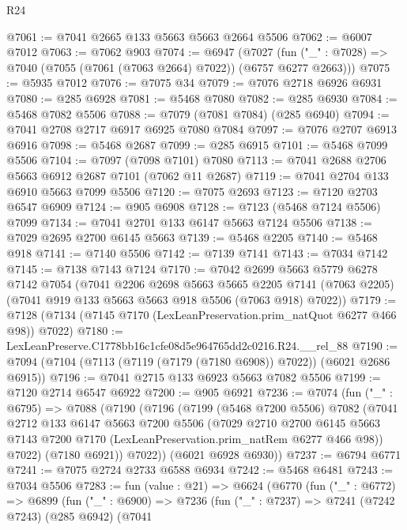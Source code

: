 \begin{lexlean}{R24}
\begin{coremodule}
@7061 := @7041 @2665 @133 @5663 @5663 @2664 @5506
@7062 := @6007 @7012
@7063 := @7062 @903
@7074 := @6947
    (@7027 (fun ("_" : @7028) => @7040 (@7055 (@7061 (@7063 @2664) @7022)) (@6757 @6277 @2663)))
@7075 := @5935 @7012
@7076 := @7075 @34
@7079 := @7076 @2718 @6926 @6931
@7080 := @285 @6928
@7081 := @5468 @7080
@7082 := @285 @6930
@7084 := @5468 @7082 @5506
@7088 := @7079 (@7081 @7084) (@285 @6940)
@7094 := @7041 @2708 @2717 @6917 @6925 @7080 @7084
@7097 := @7076 @2707 @6913 @6916
@7098 := @5468 @2687
@7099 := @285 @6915
@7101 := @5468 @7099 @5506
@7104 := @7097 (@7098 @7101) @7080
@7113 := @7041 @2688 @2706 @5663 @6912 @2687 @7101 (@7062 @11 @2687)
@7119 := @7041 @2704 @133 @6910 @5663 @7099 @5506
@7120 := @7075 @2693
@7123 := @7120 @2703 @6547 @6909
@7124 := @905 @6908
@7128 := @7123 (@5468 @7124 @5506) @7099
@7134 := @7041 @2701 @133 @6147 @5663 @7124 @5506
@7138 := @7029 @2695 @2700 @6145 @5663
@7139 := @5468 @2205
@7140 := @5468 @918
@7141 := @7140 @5506
@7142 := @7139 @7141
@7143 := @7034 @7142
@7145 := @7138 @7143 @7124
@7170 := @7042
    @2699
    @5663
    @5779
    @6278
    @7142
    @7054
    (@7041
      @2206
      @2698
      @5663
      @5665
      @2205
      @7141
      (@7063 @2205)
      (@7041 @919 @133 @5663 @5663 @918 @5506 (@7063 @918) @7022))
@7179 := @7128 (@7134 (@7145 @7170 (LexLeanPreservation.prim_natQuot @6277 @466 @98)) @7022)
@7180 := LexLeanPreserve.C1778bb16c1cfe08d5e964765dd2c0216.R24.__rel_88
@7190 := @7094 (@7104 (@7113 (@7119 (@7179 (@7180 @6908)) @7022)) (@6021 @2686 @6915))
@7196 := @7041 @2715 @133 @6923 @5663 @7082 @5506
@7199 := @7120 @2714 @6547 @6922
@7200 := @905 @6921
@7236 := @7074
    (fun ("_" : @6795) =>
    @7088
      (@7190
        (@7196
          (@7199
            (@5468 @7200 @5506)
            @7082
            (@7041
              @2712
              @133
              @6147
              @5663
              @7200
              @5506
              (@7029
                @2710
                @2700
                @6145
                @5663
                @7143
                @7200
                @7170
                (LexLeanPreservation.prim_natRem @6277 @466 @98))
              @7022)
            (@7180 @6921))
          @7022))
      (@6021 @6928 @6930))
@7237 := @6794 @6771
@7241 := @7075 @2724 @2733 @6588 @6934
@7242 := @5468 @6481
@7243 := @7034 @5506
@7283 := fun (value : @21) =>
  @6624
    (@6770
      (fun ("_" : @6772) =>
      @6899
        (fun ("_" : @6900) =>
        @7236
          (fun ("_" : @7237) =>
          @7241
            (@7242 @7243)
            (@285 @6942)
            (@7041

\end{coremodule}
\end{lexlean}
